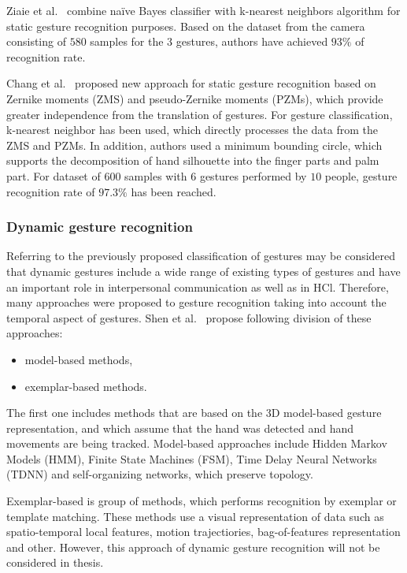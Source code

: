 Ziaie et al.~\cite{ziaie-etal-csicc2008-revised} combine naïve Bayes classifier with k-nearest neighbors algorithm for static gesture recognition purposes. Based on the dataset from the camera consisting of $580$ samples for the $3$ gestures, authors have achieved $93\%$ of recognition rate.

Chang et al.~\cite{journals/jise/ChangCTH06} proposed new approach for static gesture recognition based on Zernike moments (ZMS) and pseudo-Zernike moments (PZMs), which provide greater independence from the translation of gestures. For gesture classification, k-nearest neighbor has been used, which directly processes the data from the ZMS and PZMs. In addition, authors used a minimum bounding circle, which supports the decomposition of hand silhouette into the finger parts and palm part. For dataset of $600$ samples with $6$ gestures performed by $10$ people, gesture recognition rate of $97.3\%$ has been reached.

\subsubsection*{Dynamic gesture recognition}

Referring to the previously proposed classification of gestures may be considered that dynamic gestures include a wide range of existing types of gestures and have an important role in interpersonal communication as well as in HCl. Therefore, many approaches were proposed to gesture recognition taking into account the temporal aspect of gestures. Shen et al.~\cite{Shen:2012:DHG:2206425.2206457} propose following division of these approaches:

\begin{itemize}
\item model-based methods,
\item exemplar-based methods.
\end{itemize}

The first one includes methods that are based on the 3D model-based gesture representation, and which assume that the hand was detected and hand movements are being tracked. Model-based approaches include Hidden Markov Models (HMM), Finite State Machines (FSM), Time Delay Neural Networks (TDNN) and self-organizing networks, which preserve topology.

Exemplar-based is group of methods, which performs recognition by exemplar or template matching. These methods use a visual representation of data such as spatio-temporal local features, motion trajectiories, bag-of-features representation and other. However, this approach of dynamic gesture recognition will not be considered in thesis.

